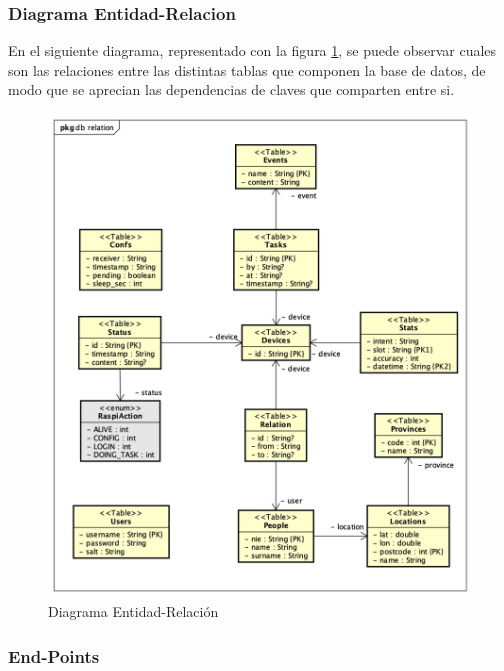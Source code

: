     \newpage
    \subsubsection{Diagrama Entidad-Relacion}
    
    En el siguiente diagrama, representado con la figura \ref{fig:d.er}, se puede observar cuales son las relaciones entre las distintas tablas que componen la base de datos, de modo que se aprecian las dependencias de claves que comparten entre si.
    
\begin{figure}[H]
    \centering
    \includegraphics[width=14cm]{./img/arch/back/d.er.png}
    \caption{Diagrama Entidad-Relación}
    \label{fig:d.er}
\end{figure}

    \subsubsection{End-Points}
    